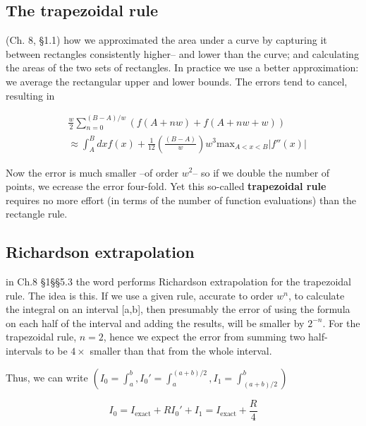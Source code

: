 \subsection{The trapezoidal rule}

 (Ch. 8, \S1.1) how we approximated the area under a curve by capturing it between rectangles consistently higher-- and lower than the curve; and calculating the areas of the two sets of rectangles. In practice we use a better approximation: we average the rectangular upper and lower bounds. The errors tend to
cancel, resulting in

\begin{align}
    & \frac{w}{2} \sum_{n=0}^{(B-A)/w} \left( f(A+nw) + f(A+nw+w)\right) \\
    & \approx \int_{A}^{B} dx f(x) + \frac{1}{12} \left( \frac{(B-A)}{w} \right) w^{3} \text{max}_{A<x<B} \vert f''(x) \vert
\end{align}

Now the error is much smaller --of order $w^{2}$-- so if we double the number of points, we ecrease the error four-fold. Yet this so-called \textbf{trapezoidal rule} requires no more effort (in terms of the number of function evaluations) than the rectangle rule.


\subsection{Richardson extrapolation}
  in Ch.8 \S1\S\S5.3 the word  performs Richardson extrapolation for the trapezoidal rule. The idea is this. If we use a given rule, accurate to order $w^{n}$, to calculate the integral on an interval [a,b], then presumably the error of using the formula on each half of the interval and adding the results, will be smaller by $2^{-n}$. For the trapezoidal rule, $n = 2$, hence we expect the error from summing two half-intervals to be $4\times$ smaller than that from the whole interval.

Thus, we can write $(I_{0} = \int_{a}^{b} , I_{0}' = \int_{a}^{(a+b)/2}, I_{1} = \int_{(a+b)/2}^{b})$

\begin{subequations}
    \begin{equation}\label{eq:08_52a}
        I_{0} = I_{\text{exact}} + R
    \end{equation}
    \begin{equation}\label{eq:08_52b}
        I_{0}' + I_{1} = I_{\text{exact}} + \frac{R}{4}
    \end{equation}
\end{subequations}

